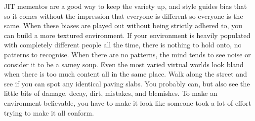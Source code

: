 \documentclass[a4paper,12pt]{article}
\begin{document}
JIT mementos are a good way to keep the variety up, and style guides bias that so it comes without the impression that everyone is different so everyone is the same.
When these biases are played out without being strictly adhered to, you can build a more textured environment.
If your environment is heavily populated with completely different people all the time, there is nothing to hold onto, no patterns to recognise.
When there are no patterns, the mind tends to see noise or consider it to be a samey soup.
Even the most varied virtual worlds look bland when there is too much content all in the same place.
Walk along the street and see if you can spot any identical paving slabs.
You probably can, but also see the little bits of damage, decay, dirt, mistakes, and blemishes.
To make an environment believable, you have to make it look like someone took a lot of effort trying to make it all conform. 
\end{document}
